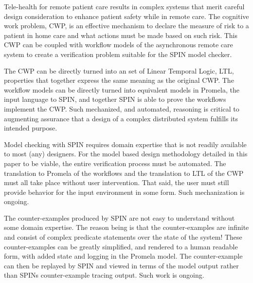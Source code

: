 Tele-health for remote patient care results in complex systems that merit careful design consideration to enhance patient safety while in remote care. The cognitive work problem, CWP, is an effective mechanism to declare the measure of risk to a patient in home care and what actions must be made based on such risk. This CWP can be coupled with workflow models of the asynchronous remote care system to create a verification problem suitable for the SPIN model checker.

The CWP can be directly turned into an set of Linear Temporal Logic, LTL, properties that together express the same meaning as the original CWP. The workflow models can be directly turned into equivalent models in Promela, the input language to SPIN, and together SPIN is able to prove the workflows implement the CWP. Such mechanized, and automated, reasoning is critical to augmenting assurance that a design of a complex distributed system fulfills its intended purpose. 

Model checking with SPIN requires domain expertise that is not readily available to most (any) designers. For the model based design methodology detailed in this paper to be viable, the entire verification process must be automated. The translation to Promela of the workflows and the translation to LTL of the CWP must all take place without user intervention. That said, the user must still provide behavior for the input environment in some form. Such mechanization is ongoing.

The counter-examples produced by SPIN are not easy to understand without some domain expertise. The reason being is that the counter-examples are infinite and consist of complex predicate statements over the state of the system! These counter-examples can be greatly simplified, and rendered to a human readable form, with added state and logging in the Promela model. The counter-example can then be replayed by SPIN and viewed in terms of the model output rather than SPINs counter-example tracing output. Such work is ongoing.